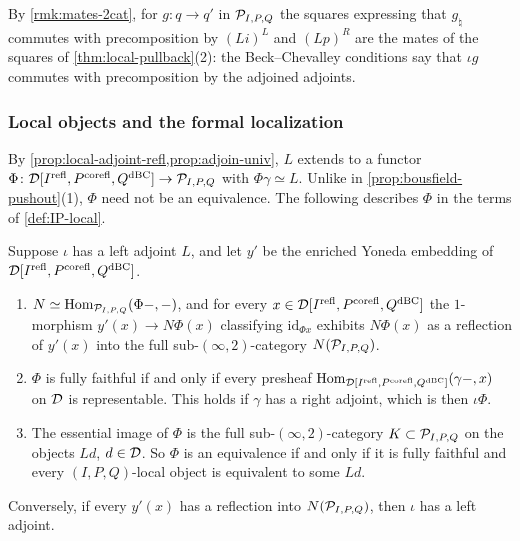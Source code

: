 %
By \cref{rmk:mates-2cat}, for $g\colon q \to q'$ in $\mathcal{P}_{I,P,Q}$ the squares
expressing that $g_{\natural}$ commutes with precomposition by $(Li)^{L}$ and
$(Lp)^{R}$ are the mates of the squares of \cref{thm:local-pullback}(2):
the Beck--Chevalley conditions say that $\iota g$ commutes with precomposition
by the adjoined adjoints.

\subsubsection*{Local objects and the formal localization}

%
By \cref{prop:local-adjoint-refl,prop:adjoin-univ}, $L$ extends to a functor
$\Phi\colon \mathcal{D}[{I}^{\mathrm{refl}},{P}^{\mathrm{corefl}},{Q}^{\mathrm{dBC}}] \to \mathcal{P}_{I,P,Q}$
with $\Phi\gamma \simeq L$. Unlike in \cref{prop:bousfield-pushout}(1),
$\Phi$ need not be an equivalence. The following describes $\Phi$ in the terms
of \cref{def:IP-local}.

\begin{prop}
\label{prop:local-vs-free}
%
Suppose $\iota$ has a left adjoint $L$, and let $y'$ be the enriched Yoneda
embedding of $\mathcal{D}[{I}^{\mathrm{refl}},{P}^{\mathrm{corefl}},{Q}^{\mathrm{dBC}}]$.
\begin{enumerate}
\item
$N \simeq \operatorname{Hom}_{\mathcal{P}_{I,P,Q}}(\Phi-,-)$,
and for every
$x \in \mathcal{D}[{I}^{\mathrm{refl}},{P}^{\mathrm{corefl}},{Q}^{\mathrm{dBC}}]$
the $1$-morphism $y'(x) \to N\Phi(x)$ classifying $\mathrm{id}_{\Phi x}$
exhibits $N\Phi(x)$ as a reflection of $y'(x)$ into the full
sub-$(\infty,2)$-category $N(\mathcal{P}_{I,P,Q})$.
\item $\Phi$ is fully faithful if and only if every presheaf
$\operatorname{Hom}_{\mathcal{D}[{I}^{\mathrm{refl}},{P}^{\mathrm{corefl}},{Q}^{\mathrm{dBC}}]}(\gamma-,x)$
on $\mathcal{D}$ is representable. This holds if $\gamma$ has a right adjoint,
which is then $\iota\Phi$.
\item The essential image of $\Phi$ is the full sub-$(\infty,2)$-category $K
\subset \mathcal{P}_{I,P,Q}$ on the objects $Ld$, $d \in \mathcal{D}$.
So $\Phi$ is an equivalence if and only if it is fully faithful and every
$(I,P,Q)$-local object is equivalent to some $Ld$.
\end{enumerate}
Conversely, if every $y'(x)$ has a reflection into $N(\mathcal{P}_{I,P,Q})$,
then $\iota$ has a left adjoint.
\end{prop}

